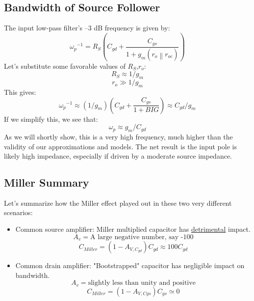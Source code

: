 \subsection{Bandwidth of Source Follower}
The input low-pass filter’s –3 dB frequency is given by:
    \begin{equation} 
        {\omega _p}^{ - 1} = {R_S}\left( {{C_{gd}} + \frac{{{C_{gs}}}}{{1 + {g_m}(\left. {{r_o}} \right\|{r_{oc}})}}} \right)
    \end{equation}
Let's substitute some favorable values of $R_S$,$r_o$:
    \begin{equation} 
        {R_S} \approx 1/{g_m} 
    \end{equation}
    \begin{equation} 
        {r_o} \gg 1/{g_m} 
    \end{equation}
This gives:
    \begin{equation} 
        {\omega _p}^{ - 1} \approx \left( {1/{g_m}} \right)\left( {{C_{gd}} + \frac{{{C_{gs}}}}{{1 + BIG}}} \right) \approx {C_{gd}}/{g_m} 
    \end{equation}
If we simplify this, we see that:
    \begin{equation}
        {\omega _p} \approx {g_m}/{C_{gd}}
    \end{equation}
As we will shortly show, this is a very high frequency, much higher than the validity of our approximations and models.  The net result is the input pole is likely high impedance, especially if driven by a moderate source impedance.
\subsection{Miller Summary}
Let's summarize how the Miller effect played out in these two very different scenarios:
\begin{itemize}
    \item Common source amplifier:  Miller multiplied capacitor has \underline{detrimental} impact.
        \[
        	A_v = \text{A large negative number, say -100} 
        \]
        \[	
        	{C_{Miller}} = (1 - {A_{V,{C_{gd}}}}){C_{gd}} \approx 100{C_{gd}}
        \]
    \item Common drain amplifier:  "Bootstrapped" capacitor has negligible impact on bandwidth.
        \[
        	A_v = \text{slightly less than unity and positive} 
        \]
        \[
        	{C_{Miller}} = (1 - {A_{V,Cgs}}){C_{gs}} \simeq 0
        \]
\end{itemize}
